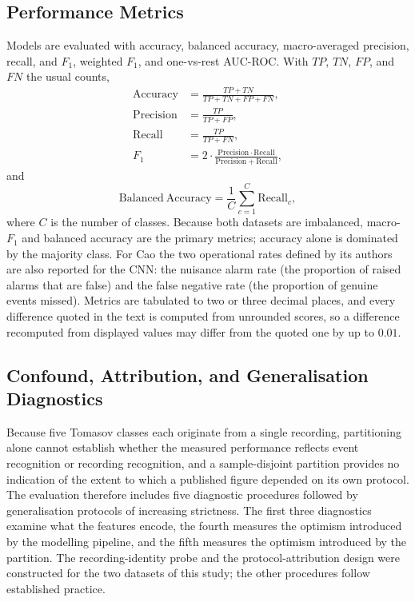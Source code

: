 \subsection{Performance Metrics}
\label{sec:chap3Metrics}
Models are evaluated with accuracy, balanced accuracy, macro-averaged precision, recall, and $F_1$, weighted $F_1$, and one-vs-rest AUC-ROC. With $TP$, $TN$, $FP$, and $FN$ the usual counts,
\begin{align}
	\mathrm{Accuracy}  &= \frac{TP + TN}{TP + TN + FP + FN},\\[1ex]
	\mathrm{Precision} &= \frac{TP}{TP + FP},\\[1ex]
	\mathrm{Recall}    &= \frac{TP}{TP + FN},\\[1ex]
	F_1                &= 2 \cdot \frac{\mathrm{Precision} \cdot \mathrm{Recall}}{\mathrm{Precision} + \mathrm{Recall}},
\end{align}
and
\begin{equation}
	\mathrm{Balanced\ Accuracy} = \frac{1}{C}\sum_{c=1}^{C}\mathrm{Recall}_c ,
\end{equation}
where $C$ is the number of classes. Because both datasets are imbalanced, macro-$F_1$ and balanced accuracy are the primary metrics; accuracy alone is dominated by the majority class. For Cao the two operational rates defined by its authors are also reported for the CNN: the nuisance alarm rate (the proportion of raised alarms that are false) and the false negative rate (the proportion of genuine events missed). Metrics are tabulated to two or three decimal places, and every difference quoted in the text is computed from unrounded scores, so a difference recomputed from displayed values may differ from the quoted one by up to $0.01$.

\subsection{Confound, Attribution, and Generalisation Diagnostics}
\label{sec:chap3ConfoundDesign}
Because five Tomasov classes each originate from a single recording, partitioning alone cannot establish whether the measured performance reflects event recognition or recording recognition, and a sample-disjoint partition provides no indication of the extent to which a published figure depended on its own protocol. The evaluation therefore includes five diagnostic procedures followed by generalisation protocols of increasing strictness. The first three diagnostics examine what the features encode, the fourth measures the optimism introduced by the modelling pipeline, and the fifth measures the optimism introduced by the partition. The recording-identity probe and the protocol-attribution design were constructed for the two datasets of this study; the other procedures follow established practice.

